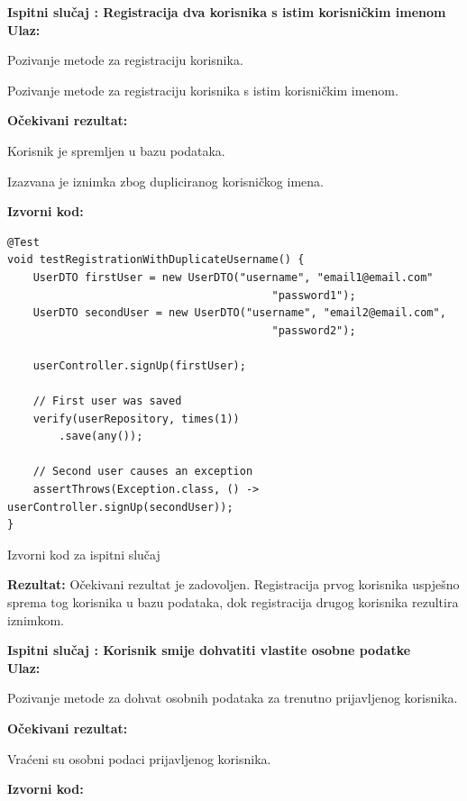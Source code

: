 			\noindent \textbf{Ispitni slučaj \thetestcase: Registracija dva korisnika s istim korisničkim imenom} \\
			\noindent \textbf{Ulaz:}
			\begin{packed_enum}
				\item Pozivanje metode za registraciju korisnika.
				\item Pozivanje metode za registraciju korisnika s istim korisničkim imenom.
			\end{packed_enum}
			\noindent \textbf{Očekivani rezultat:}
			\begin{packed_enum}
				\item[1.a] Korisnik je spremljen u bazu podataka.
				\item[2.a] Izazvana je iznimka zbog dupliciranog korisničkog imena.
			\end{packed_enum}
			\noindent \textbf{Izvorni kod:}
			\begin{listing}[H]
\begin{verbatim}
@Test
void testRegistrationWithDuplicateUsername() {
	UserDTO firstUser = new UserDTO("username", "email1@email.com"
                                         "password1");
	UserDTO secondUser = new UserDTO("username", "email2@email.com",
                                         "password2");
		
	userController.signUp(firstUser);
	
	// First user was saved
	verify(userRepository, times(1))
	    .save(any());
	
	// Second user causes an exception
	assertThrows(Exception.class, () -> userController.signUp(secondUser));
}
\end{verbatim}
				\caption{Izvorni kod za ispitni slučaj \thetestcase}
				\label{test5}
			\end{listing}
			\noindent \textbf{Rezultat:} Očekivani rezultat je zadovoljen. Registracija prvog korisnika uspješno sprema tog korisnika u bazu podataka, dok registracija drugog korisnika rezultira iznimkom. 
			\clearpage
			
			\noindent \textbf{Ispitni slučaj \thetestcase: Korisnik smije dohvatiti vlastite osobne podatke} \\
			\noindent \textbf{Ulaz:}
			\begin{packed_enum}
				\item Pozivanje metode za dohvat osobnih podataka za trenutno prijavljenog korisnika.
			\end{packed_enum}
			\noindent \textbf{Očekivani rezultat:}
			\begin{packed_enum}
				\item[1.a] Vraćeni su osobni podaci prijavljenog korisnika.
			\end{packed_enum}
			\noindent \textbf{Izvorni kod:}

